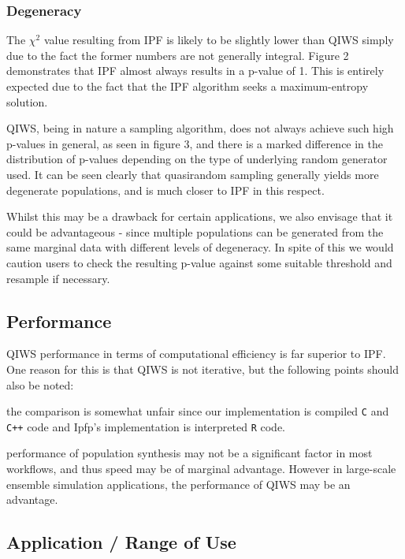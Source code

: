 \documentclass{JASSS}
\begin{document}
\subsubsection{Degeneracy}\label{degeneracy}

The \(\chi^2\) value resulting from IPF is likely to be slightly lower
than QIWS simply due to the fact the former numbers are not generally integral.
Figure 2 demonstrates that IPF almost always results in a p-value of 1.
This is entirely expected due to the fact that the IPF algorithm seeks a 
maximum-entropy solution.

QIWS, being in nature a sampling algorithm, does not always achieve such high p-values in general, 
as seen in figure 3, and there is a marked difference in the distribution of p-values
depending on the type of underlying random generator used. It can be
seen clearly that quasirandom sampling generally yields more degenerate
populations, and is much closer to IPF in this respect.

Whilst this may be a drawback for certain applications, we also envisage that it could be advantageous - since multiple populations can be generated from the same marginal data with different levels of degeneracy. In spite of this we would caution users to check the resulting p-value against some suitable threshold
and resample if necessary.

\subsection{Performance}\label{performance-1}

QIWS performance in terms of computational efficiency is far superior to IPF. One reason for this is that
QIWS is not iterative, but the following points should also be noted:

\begin{itemize*}
\item
  the comparison is somewhat unfair since our implementation is compiled
  \texttt{C} and \texttt{C++} code and Ipfp's implementation is
  interpreted \texttt{R} code.
\item
  performance of population synthesis may not be a significant factor in
  most workflows, and thus speed may be of marginal advantage. However
  in large-scale ensemble simulation applications, the performance of
  QIWS may be an advantage.
\end{itemize*}

\subsection{Application / Range of Use}\label{application-range-of-use}
\end{document}
